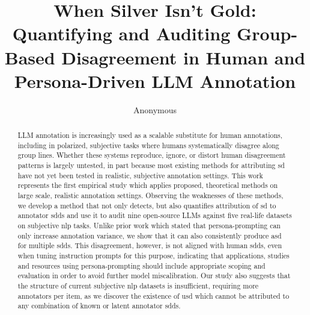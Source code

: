 \documentclass[manuscript,screen,review,anonymous]{acmart}
\title[Quantifying and Auditing Group-Based Disagreement]{When Silver Isn't Gold: Quantifying and Auditing Group-Based Disagreement in Human and Persona-Driven LLM Annotation}
\author{Anonymous}
\theoremstyle{acmplain}
\theoremstyle{researchquestionstyle}
\begin{document}
\begin{abstract}
	LLM annotation is increasingly used as a scalable substitute for human annotations, including in polarized, subjective tasks where humans systematically disagree along group lines. Whether these systems reproduce, ignore, or distort human disagreement patterns is largely untested, in part because most existing methods for attributing \ac{sd} have not yet been tested in realistic, subjective annotation settings. This work represents the first empirical study which applies proposed, theoretical methods on large scale, realistic annotation settings. Observing the weaknesses of these methods, we develop a method that not only detects, but also quantifies attribution of \acs{sd} to annotator \acp{sdd} and use it to audit nine open-source LLMs against five real-life datasets on subjective \ac{nlp} tasks. Unlike prior work which stated that persona-prompting can only increase annotation variance, we show that it can also consistently produce \ac{asd} for multiple \acsp{sdd}. This disagreement, however, is not aligned with human \acsp{sdd}, even when tuning instruction prompts for this purpose, indicating that applications, studies and resources using persona-prompting should include appropriate scoping and evaluation in order to avoid further model miscalibration. Our study also suggests that the structure of current subjective \acs{nlp} datasets is insufficient, requiring more annotators per item, as we discover the existence of \ac{usd} which cannot be attributed to any combination of known or latent annotator \acsp{sdd}.
\end{abstract}
\end{document}

